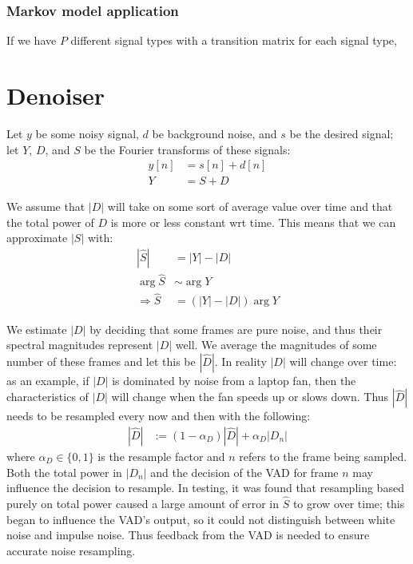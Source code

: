 \documentclass{article}
\begin{document}
\subsubsection{Markov model application}
If we have $P$ different signal types with a transition matrix for each signal type, 

\section{Denoiser}
Let $y$ be some noisy signal, $d$ be background noise, and $s$ be the desired signal; let $Y$, $D$, and $S$ be the Fourier transforms of these signals:
\begin{align}
  y[n] &= s[n] + d[n]\\
  Y &= S + D
\end{align}

We assume that $|D|$ will take on some sort of average value over time and that the total power of $D$ is more or less constant wrt time. This means that we can approximate $|S|$ with:
\begin{align}
  |\hat{S}| &= |Y| - |D|\\
  \arg{\hat{S}} &\sim \arg{Y}\\
  \Rightarrow \hat{S} &= (|Y| - |D|)\arg{Y}
\end{align}

We estimate $|D|$ by deciding that some frames are pure noise, and thus their spectral magnitudes represent $|D|$ well. We average the magnitudes of some number of these frames and let this be $|\hat{D}|$. In reality $|D|$ will change over time: as an example, if $|D|$ is dominated by noise from a laptop fan, then the characteristics of $|D|$ will change when the fan speeds up or slows down. Thus $|\hat{D}|$ needs to be resampled every now and then with the following:
\begin{align}
  |\hat{D}| &:= (1 - \alpha_D)|\hat{D}| + \alpha_D|D_n|
\end{align}
where $\alpha_D \in \{0,1\}$ is the resample factor and $n$ refers to the frame being sampled. Both the total power in $|D_n|$ and the decision of the VAD for frame $n$ may influence the decision to resample. In testing, it was found that resampling based purely on total power caused a large amount of error in $\hat{S}$ to grow over time; this began to influence the VAD's output, so it could not distinguish between white noise and impulse noise. Thus feedback from the VAD is needed to ensure accurate noise resampling.
\end{document}
